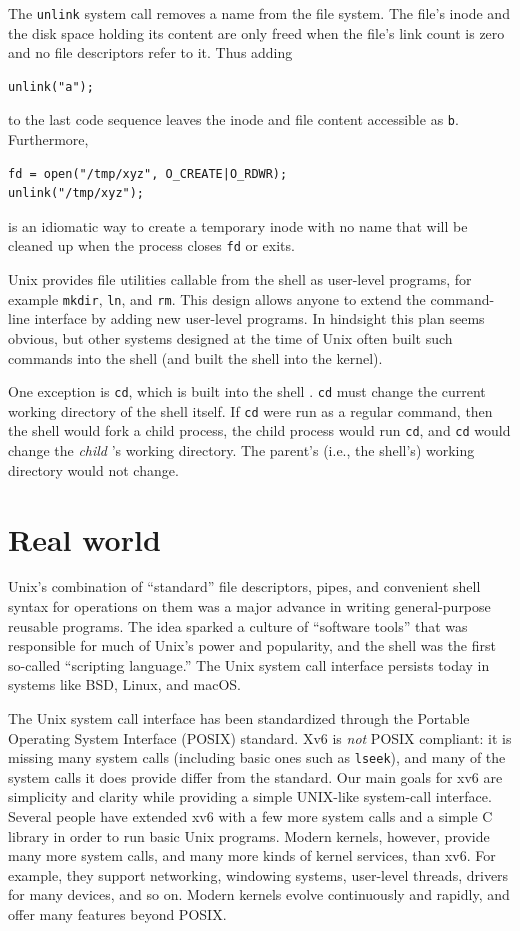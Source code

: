 The
\lstinline{unlink}
system call removes a name from the file system.
The file's inode and the disk space holding its content
are only freed when the file's link count is zero and
no file descriptors refer to it.
Thus adding
\begin{lstlisting}[]
unlink("a");
\end{lstlisting}
to the last code sequence leaves the inode
and file content accessible as
\lstinline{b}.
Furthermore,
\begin{lstlisting}[]
fd = open("/tmp/xyz", O_CREATE|O_RDWR);
unlink("/tmp/xyz");
\end{lstlisting}
is an idiomatic way to create a temporary inode 
with no name
that will be cleaned up when the process closes 
\lstinline{fd}
or exits.

Unix provides
file utilities callable from the shell
as user-level programs, for example
\lstinline{mkdir},
\lstinline{ln},
and
\lstinline{rm}.
This design allows anyone to extend the command-line interface
by adding new user-level programs.  In hindsight this plan seems obvious,
but other systems designed at the time of Unix often built such commands into
the shell (and built the shell into the kernel).

One exception is
\lstinline{cd},
which is built into the shell
.
\lstinline{cd}
must change the current working directory of the
shell itself.  If
\lstinline{cd}
were run as a regular command, then the shell would fork a child
process, the child process would run
\lstinline{cd},
and
\lstinline{cd}
would change the 
\textit{child} 's 
working directory.  The parent's (i.e.,
the shell's) working directory would not change.
\section{Real world}

Unix's combination of ``standard'' file
descriptors, pipes, and convenient shell syntax for
operations on them was a major advance in writing
general-purpose reusable programs.
The idea sparked a culture of ``software tools'' that was
responsible for much of Unix's power and popularity,
and the shell was the first so-called ``scripting language.''
The Unix system call interface persists today in systems like
BSD, Linux, and macOS.

The Unix system call interface has been standardized through the Portable
Operating System Interface (POSIX) standard.
Xv6 is
\textit{not}
POSIX compliant:  it is missing many system calls (including basic ones such as
\lstinline{lseek}),
and many of the system calls it does provide differ from the standard.
Our main goals for xv6 are
simplicity and clarity while providing a simple UNIX-like system-call interface.
Several people have extended xv6 with a few more system calls and a simple
C library in order to run basic Unix programs.  Modern kernels, however,
provide many more system calls, and many more kinds of kernel services, than
xv6.  For example, they support networking, windowing systems, user-level threads,
drivers for many devices, and so on.  Modern kernels evolve continuously and
rapidly, and offer many features beyond POSIX.

